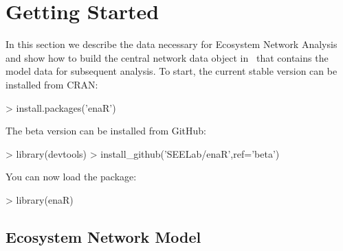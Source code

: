 \documentclass[article]{jss}
\newcommand{\R}{\proglang{R}}
\begin{document}

\section{Getting Started}

In this section we describe the data necessary for Ecosystem
Network Analysis and show how to build the central network data object
in \R\ that contains the model data for subsequent analysis.  To
start, the current stable version can be installed from CRAN:

\begin{Schunk}
\begin{Sinput}
> install.packages('enaR')
\end{Sinput}
\end{Schunk}

The beta version can be installed from GitHub:

\begin{Schunk}
\begin{Sinput}
> library(devtools)
> install_github('SEELab/enaR',ref='beta')
\end{Sinput}
\end{Schunk}

You can now load the package:

\begin{Schunk}
\begin{Sinput}
> library(enaR)
\end{Sinput}
\end{Schunk}





\subsection{Ecosystem Network Model}
\end{document}
